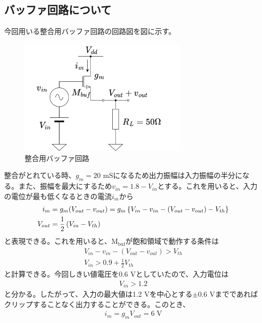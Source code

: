 \documentclass[twocolumn]{jsarticle}
\begin{document}
    \subsection{バッファ回路について}
        今回用いる整合用バッファ回路の回路図を図に示す。
        \begin{figure}[bh]
            \begin{center}
                \includegraphics*[width = 80mm]{figures/resister_buf.png}
                \caption{整合用バッファ回路}
                \label{fig:buf_circuit}
            \end{center}
        \end{figure}
        整合がとれている時、$g_{m}=20$ mSになるため出力振幅は入力振幅の半分になる。また、振幅を最大にするため$v_{in}=1.8-V_{in}$とする。これを用いると、入力の電位が最も低くなるときの電流$i_{m}$から
        \begin{align*}
            i_{m}&=g_{m}(V_{out}-v_{out})=g_{m}\left\{ V_{in}-v_{in} -(V_{out}-v_{out}) -V_{th} \right\}      \notag \\
            V_{out}&=\frac{1}{2}\left( V_{in}-V_{th} \right)
        \end{align*}
        と表現できる。これを用いると、$\mathrm{M_{buf}}$が飽和領域で動作する条件は
        \begin{align*}
            V_{in}-v_{in}-\left( V_{out}-v_{out} \right) > V_{th}   \\
            V_{in} > 0.9 +\frac{1}{2}V_{th}
        \end{align*}
        と計算できる。今回しきい値電圧を0.6 Vとしていたので、入力電位は
        \begin{align}
            V_{in}>1.2  \label{eq:buf_in_sat}
        \end{align}
        と分かる。したがって、入力の最大値は1.2 Vを中心とする$\pm 0.6$ Vまでであればクリップすることなく出力することができる。このとき、
        \begin{align*}
            i_{m}=g_{m}V_{out}=6\;\mathrm{V}
        \end{align*}
\end{document}
